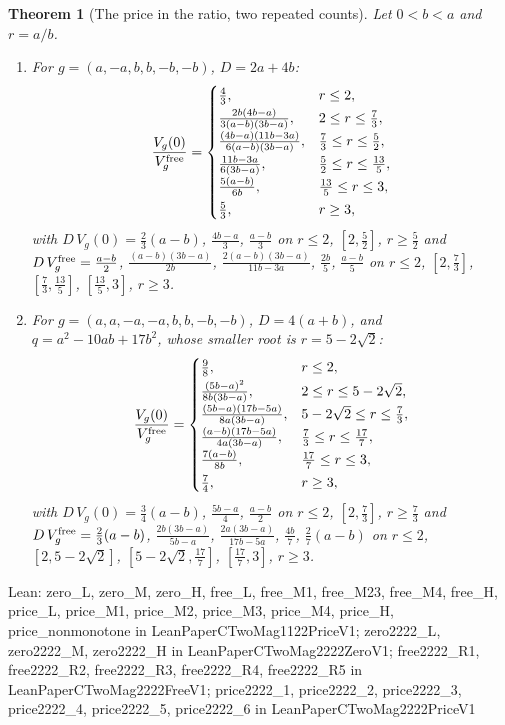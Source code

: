 \documentclass[conference]{IEEEtran}
\newtheorem{theorem}{Theorem}
\theoremstyle{definition}
\newcommand{\lean}[1]{\textsf{\footnotesize #1}}
\newcommand{\leanbox}[1]{%
  \par\vspace{2pt}\noindent
  {\raggedright\footnotesize\textsf{Lean: #1}\par}\vspace{2pt}}
\begin{document}
\begin{theorem}[The price in the ratio, two repeated counts]
\label{thm:twomagprice}
Let $0<b<a$ and $r=a/b$.
\begin{enumerate}
\item For $g=(a,-a,b,b,-b,-b)$, $D=2a+4b$:
\[
\frac{V_g(0)}{V_g^{\rm free}}=
\begin{cases}
\frac43, & r\le2,\\[2pt]
\frac{2b(4b-a)}{3(a-b)(3b-a)}, & 2\le r\le\frac73,\\[2pt]
\frac{(4b-a)(11b-3a)}{6(a-b)(3b-a)}, & \frac73\le r\le\frac52,\\[2pt]
\frac{11b-3a}{6(3b-a)}, & \frac52\le r\le\frac{13}5,\\[2pt]
\frac{5(a-b)}{6b}, & \frac{13}5\le r\le3,\\[2pt]
\frac53, & r\ge3,
\end{cases}
\]
with $D\,V_g(0)=\frac23(a-b)$, $\frac{4b-a}3$, $\frac{a-b}3$ on $r\le2$, $[2,\frac52]$, $r\ge\frac52$ and
$D\,V_g^{\rm free}=\frac{a-b}2$, $\frac{(a-b)(3b-a)}{2b}$, $\frac{2(a-b)(3b-a)}{11b-3a}$, $\frac{2b}5$,
$\frac{a-b}5$ on $r\le2$, $[2,\frac73]$, $[\frac73,\frac{13}5]$, $[\frac{13}5,3]$, $r\ge3$.
\item For $g=(a,a,-a,-a,b,b,-b,-b)$, $D=4(a+b)$, and $q=a^2-10ab+17b^2$, whose smaller root is
$r=5-2\sqrt2$:
\[
\frac{V_g(0)}{V_g^{\rm free}}=
\begin{cases}
\frac98, & r\le2,\\[2pt]
\frac{(5b-a)^2}{8b(3b-a)}, & 2\le r\le5-2\sqrt2,\\[2pt]
\frac{(5b-a)(17b-5a)}{8a(3b-a)}, & 5-2\sqrt2\le r\le\frac73,\\[2pt]
\frac{(a-b)(17b-5a)}{4a(3b-a)}, & \frac73\le r\le\frac{17}7,\\[2pt]
\frac{7(a-b)}{8b}, & \frac{17}7\le r\le3,\\[2pt]
\frac74, & r\ge3,
\end{cases}
\]
with $D\,V_g(0)=\frac34(a-b)$, $\frac{5b-a}4$, $\frac{a-b}2$ on $r\le2$, $[2,\frac73]$, $r\ge\frac73$ and
$D\,V_g^{\rm free}=\frac23(a-b)$, $\frac{2b(3b-a)}{5b-a}$, $\frac{2a(3b-a)}{17b-5a}$, $\frac{4b}7$,
$\frac27(a-b)$ on $r\le2$, $[2,5-2\sqrt2]$, $[5-2\sqrt2,\frac{17}7]$, $[\frac{17}7,3]$, $r\ge3$.
\end{enumerate}
\end{theorem}
\leanbox{\lean{zero\_L}, \lean{zero\_M}, \lean{zero\_H}, \lean{free\_L}, \lean{free\_M1},
\lean{free\_M23}, \lean{free\_M4}, \lean{free\_H}, \lean{price\_L}, \lean{price\_M1},
\lean{price\_M2}, \lean{price\_M3}, \lean{price\_M4}, \lean{price\_H}, \lean{price\_nonmonotone} in
\lean{LeanPaperCTwoMag1122PriceV1}; \lean{zero2222\_L}, \lean{zero2222\_M}, \lean{zero2222\_H} in
\lean{LeanPaperCTwoMag2222ZeroV1}; \lean{free2222\_R1}, \lean{free2222\_R2}, \lean{free2222\_R3},
\lean{free2222\_R4}, \lean{free2222\_R5} in \lean{LeanPaperCTwoMag2222FreeV1};
\lean{price2222\_1}, \lean{price2222\_2}, \lean{price2222\_3}, \lean{price2222\_4},
\lean{price2222\_5}, \lean{price2222\_6} in \lean{LeanPaperCTwoMag2222PriceV1}}
\end{document}
